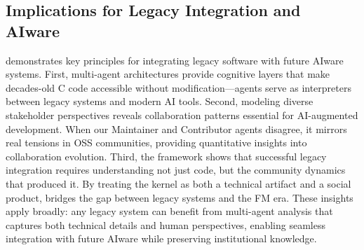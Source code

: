 \subsection{Implications for Legacy Integration and AIware}

\sys demonstrates key principles for integrating legacy software with future AIware systems. First, multi-agent architectures provide cognitive layers that make decades-old C code accessible without modification—agents serve as interpreters between legacy systems and modern AI tools. Second, modeling diverse stakeholder perspectives reveals collaboration patterns essential for AI-augmented development. When our Maintainer and Contributor agents disagree, it mirrors real tensions in OSS communities, providing quantitative insights into collaboration evolution. Third, the framework shows that successful legacy integration requires understanding not just code, but the community dynamics that produced it. By treating the kernel as both a technical artifact and a social product, \sys bridges the gap between legacy systems and the FM era. These insights apply broadly: any legacy system can benefit from multi-agent analysis that captures both technical details and human perspectives, enabling seamless integration with future AIware while preserving institutional knowledge.
